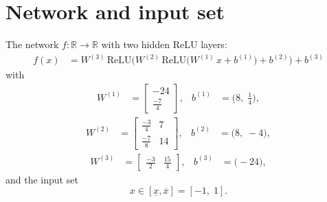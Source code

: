 \documentclass[11pt]{article}
\begin{document}
\section{Network and input set}
The network $f:\mathbb{R} \to \mathbb{R}$ with two hidden ReLU layers:
\begin{align*}
f(x) &= W^{(3)}\,\mathrm{ReLU}\bigl(W^{(2)}\,\mathrm{ReLU}\bigl(W^{(1)}\,x + b^{(1)}\bigr) + b^{(2)}\bigr) + b^{(3)}
\end{align*}
with
\begin{align*}
W^{(1)} &= \begin{bmatrix}
-24 \\
\frac{-7}{4}
\end{bmatrix}, & b^{(1)} &= \bigl(8,\; \frac{1}{4}\bigr),
\end{align*}
\begin{align*}
W^{(2)} &= \begin{bmatrix}
\frac{-3}{4} & 7 \\
\frac{-7}{8} & 14
\end{bmatrix}, & b^{(2)} &= \bigl(8,\; -4\bigr),
\end{align*}
\begin{align*}
W^{(3)} &= \begin{bmatrix}
\frac{-3}{2} & \frac{15}{4}
\end{bmatrix}, & b^{(3)} &= \bigl(-24\bigr),
\end{align*}
and the input set
\begin{equation*}
 x \in [\underline{x}, \overline{x}] = [-1,\; 1].
\end{equation*}
\end{document}

